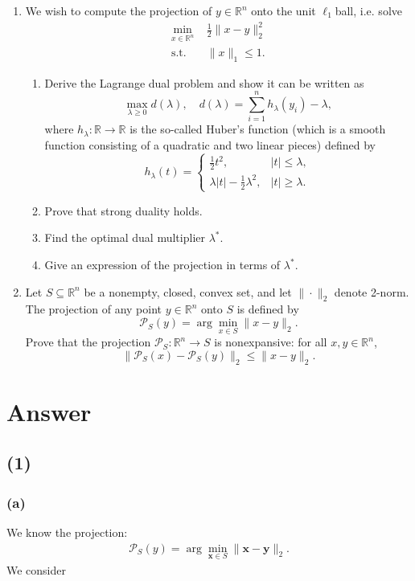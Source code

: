 \documentclass[12pt]{article}
\begin{document}
\begin{enumerate}
\item We wish to compute the projection of $y \in \mathbb{R}^n$ onto the unit $\ell_1$ball, i.e. solve
\[\begin{aligned}
\min_{x\in\mathbb{R}^n} &\frac{1}{2}\|x - y\|_2^2\\
\text{s.t.} \quad &\|x\|_1 \leq 1.
\end{aligned}\]
    \begin{enumerate}
    \item Derive the Lagrange dual problem and show it can be written as
    \[\max_{\lambda\geq 0} d(\lambda), \quad d(\lambda) = \sum_{i=1}^n h_\lambda(y_i) - \lambda,\]
    where $h_\lambda : \mathbb{R} \to \mathbb{R}$ is the so-called Huber's function (which is a smooth function consisting of a quadratic and two linear pieces) defined by
    \[h_\lambda(t) = \begin{cases}
    \frac{1}{2}t^2, & |t| \leq \lambda,\\
    \lambda |t| - \frac{1}{2}\lambda^2, & |t| \geq \lambda.
    \end{cases}\]
    \item Prove that strong duality holds.
    \item Find the optimal dual multiplier $\lambda^*$.
    \item Give an expression of the projection in terms of $\lambda^*$.
    \end{enumerate}
\item Let $S \subseteq \mathbb{R}^n$ be a nonempty, closed, convex set, and let $\|\cdot\|_2$ denote 2-norm. The projection of any point $y \in \mathbb{R}^n$ onto $S$ is defined by
\[\mathcal{P}_S(y) = \arg\min_{x\in S} \|x-y\|_2.\]
Prove that the projection $\mathcal{P}_S : \mathbb{R}^n \to S$ is nonexpansive: for all $x, y \in \mathbb{R}^n$,
\[\|\mathcal{P}_S(x) - \mathcal{P}_S(y)\|_2 \leq \|x-y\|_2.\]
\end{enumerate}

\section{Answer}
\subsection{(1)}
\subsubsection{(a)}
We know the projection:
\begin{align*}
    \mathcal{P}_S(y) = \arg\min_{\bm{x} \in S} \|\bm{x} - \bm{y}\|_2.
\end{align*}
We consider
\end{document}
